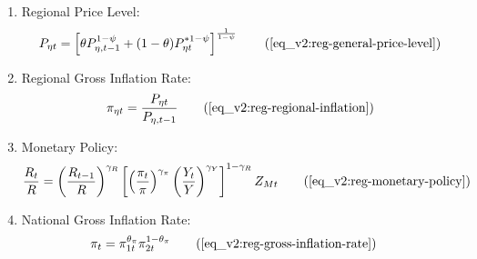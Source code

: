 \documentclass[../thesis.tex]{subfiles}
\begin{document}
{\begin{itemize}
\begin{enumerate}
		\item Regional Price Level:
		\begin{align}
			P_{\eta t} = \left[ \theta P_{\eta,t-1}^{1-\psi} + (1-\theta) P_{\eta t}^{\ast 1-\psi} \right]^\frac{1}{1-\psi} \tag{\ref{eq_v2:reg-general-price-level}}
		\end{align}
		
		\item Regional Gross Inflation Rate:
		\begin{align}
			\pi_{\eta t} = \frac{P_{\eta t}}{P_{\eta, t-1}} \tag{\ref{eq_v2:reg-regional-inflation}}
		\end{align}
		
		\begin{comment}
			\item Intermediate-goods Firms Profit:
			\begin{align}
				\Pi_{\eta t} &= \int_{0}^{1} P_{\eta t} Y_{\eta jt} - W_{\eta t} L_{\eta jt} \dif j \tag{\ref{eq_v2:reg-int-good-firm-profit-total-2}}
			\end{align}	
		\end{comment}
		
		\item Monetary Policy:
		\begin{align}
			\frac{R_{t}}{R} = \left( \frac{R_{t-1}}{R} \right)^{\gamma_{R}} \left[ \left( \frac{\pi_t}{\pi} \right)^{\gamma_{\pi}} \left( \frac{Y_{t}}{Y} \right)^{\gamma_{Y}} \right]^{1-\gamma_{R}} Z_{Mt} \tag{\ref{eq_v2:reg-monetary-policy}}
		\end{align}
		
		\item National Gross Inflation Rate:
		\begin{align}
			\pi_{t} &= \pi_{1t}^{\theta_{\pi}} \pi_{2t}^{1 - \theta_{\pi}} \tag{\ref{eq_v2:reg-gross-inflation-rate}}
		\end{align}
		
		\begin{comment}
		\item National Price Level:
		\begin{align}
			P_{t} &= \frac{P_{1t} Y_{1t} + P_{2t} Y_{2t}}{Y_{t}} \tag{\ref{eq_v2:reg-national-price-level}} %
		\end{align}			
		\end{comment}
				

\end{enumerate}
\end{itemize}}
\end{document}
